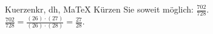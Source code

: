 \begin{MAufgabe}{Kuerzen}{kr, dh, MaTeX}
K\"urzen Sie soweit m\"oglich: $\frac{702}{728}$.\\ 
\ifLsg\MLoesung
\quad $\frac{702}{728}=\frac{(26)\cdot(27)}{(26)\cdot(28)}=\frac{27}{28}$.\else\relax\fi
 \end{MAufgabe}